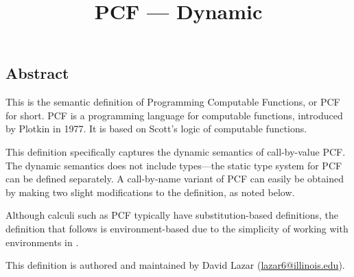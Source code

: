 \setlength{\parindent}{1em}
\title{PCF --- Dynamic}

\maketitle

\begin{kblock}[text]
\section*{Abstract}
This is the \K semantic definition of Programming Computable Functions, or PCF for short. PCF is a programming language for computable functions, introduced by Plotkin in 1977. It is based on Scott's logic of computable functions.

This definition specifically captures the dynamic semantics of call-by-value PCF.  The dynamic semantics does not include types---the static type system for PCF can be defined separately. A call-by-name variant of PCF can easily be obtained by making two slight modifications to the definition, as noted below.

Although calculi such as PCF typically have substitution-based definitions, the definition that follows is environment-based due to the simplicity of working with environments in \K.

This \K definition is authored and maintained by David Lazar (\href{mailto:lazar6@illinois.edu}{lazar6@illinois.edu}).
\end{kblock}

\vspace*{3ex}
